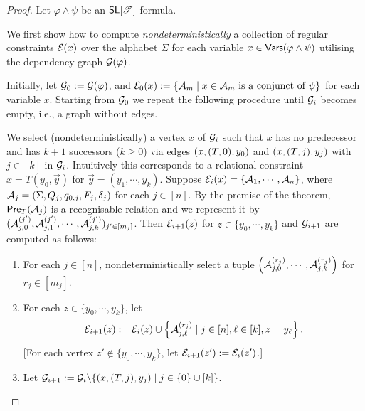 \begin{proof}
Let $\varphi \wedge \psi$ be an $\textsf{SL}[\mathscr{T}]$ formula. 

We first show how to compute \emph{nondeterministically} a collection of regular constraints $\mathcal{E}(x)$ over the alphabet $\Sigma$ for each variable $x \in \mathsf{Vars}(\varphi \wedge \psi)$ utilising the dependency graph $\mathcal{G}(\varphi)$. 


Initially, let $\mathcal{G}_0:= \mathcal{G}(\varphi)$, and
$\mathcal{E}_0(x):= \left\{\mathcal{A}_m\mid x\in \mathcal{A}_m\text{ is a conjunct of }\psi \right\}$ for each variable $x$. 
%
Starting from $\mathcal{G}_0$ we repeat the following procedure until %
$\mathcal{G}_i$ becomes empty, i.e., a graph without edges.
 
We select (nondeterministically) a vertex $x$ of $\mathcal{G}_i$ such that $x$ has no predecessor and has $k+1$ successors ($k\geq 0$) via edges $(x, (T, 0), y_0)$ and $(x, (T, j), y_j)$ with $j \in [k]$ in $\mathcal{G}_i$. Intuitively this corresponds to a relational constraint $x=T(y_0, \vec{y})$ for $\vec{y}=(y_1, \cdots, y_k)$. Suppose $\mathcal{E}_i(x)=\{\mathcal{A}_1, \cdots, \mathcal{A}_n\}$, where $\mathcal{A}_j = (\Sigma, Q_j, q_{0,j}, F_j, \delta_j)$ for each $j \in [n]$. %
By the premise of the theorem, $\textsf{Pre}_{T}(\mathcal{A}_j)$ is a recognisable relation and  we  represent it by $(\mathcal{A}^{(j')}_{j, 0}, \mathcal{A}^{(j')}_{j, 1}, \cdots, \mathcal{A}^{(j')}_{j, k})_{ j'  \in [m_j]}$.
Then $\mathcal{E}_{i+1}(z)$ for $z \in  \{y_0,\cdots, y_k\}$ and $\mathcal{G}_{i+1}$ are computed as follows:
\begin{enumerate}
\item For each $j \in [n]$, nondeterministically select a tuple $\left(\mathcal{A}^{(r_j)}_{j, 0}, \cdots, \mathcal{A}^{(r_j)}_{j, k}\right)$ for $r_j \in [m_j]$.
%
\item For each $z \in \{y_0,\cdots, y_k\}$, let
\[
    \mathcal{E}_{i+1}(z):= \mathcal{E}_{i}(z) \cup \left\{\mathcal{A}^{(r_j)}_{j, \ell} \mid  j \in [n], \ell \in [k], z = y_{\ell} \right\}.
\]
[For each vertex $z'  {\notin} \{y_0,\cdots, y_k\}$, let $\mathcal{E}_{i+1}(z') := \mathcal{E}_i(z')$.]
%
\item Let $\mathcal{G}_{i+1}:= \mathcal{G}_i \backslash \{(x, (T, j), y_j) \mid j \in \{0\} \cup [k]\}$.
\end{enumerate}
%


\end{proof}
